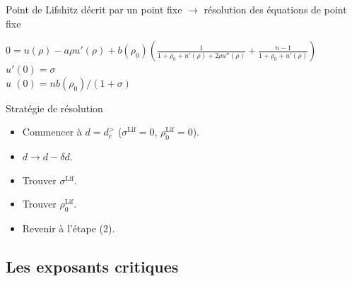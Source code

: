 \documentclass[xcolor=dvipsnames]{beamer}
\begin{document}
\begin{frame}
Point de Lifshitz décrit par un point fixe $\rightarrow$ résolution des équations de point fixe 
\begin{block}{}
$0 = u(\rho) - a  \rho u'(\rho) + b(\rho_0) \left( \frac{1}{1 + \rho_0 + u'(\rho) + 2 \rho u''(\rho)} + \frac{n-1}{1+\rho_0+u'(\rho)} \right)$ \\
$u'(0) = \sigma$ \\
$u\phantom{'}(0) = n b(\rho_0)/(1+\sigma)$
\end{block}

\begin{block}{Stratégie de résolution}
\begin{itemize}
\item Commencer à $d=d_c^>$ ($\sigma^\text{Lif} = 0$, $\rho^\text{Lif}_{0} = 0$).
\item $d \rightarrow d - \delta d$. 
\item Trouver $\sigma^\text{Lif}$.
\item Trouver $\rho^\text{Lif}_{0}$.
\item Revenir à l'étape (2).
\end{itemize}
\end{block}

\end{frame}

\subsection{Les exposants critiques}
\end{document}
